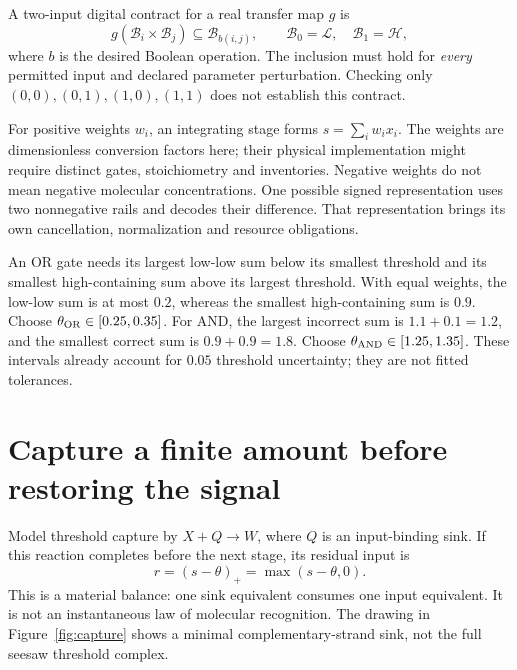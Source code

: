 A two-input digital contract for a real transfer map $g$ is
\begin{equation}
 g(\mathcal B_i\times\mathcal B_j)\subseteq
 \mathcal B_{b(i,j)},\qquad
 \mathcal B_0=\mathcal L,\quad \mathcal B_1=\mathcal H ,
\end{equation}
where $b$ is the desired Boolean operation. The inclusion must hold for
\emph{every} permitted input and declared parameter perturbation. Checking only
$(0,0),(0,1),(1,0),(1,1)$ does not establish this contract.

For positive weights $w_i$, an integrating stage forms
$s=\sum_iw_ix_i$. The weights are dimensionless conversion factors here;
their physical implementation might require distinct gates, stoichiometry
and inventories. Negative weights do not mean negative molecular concentrations.
One possible signed representation uses two nonnegative rails and decodes their
difference. That representation brings its own cancellation, normalization and
resource obligations.

An OR gate needs its largest low-low sum below its smallest threshold and its
smallest high-containing sum above its largest threshold. With equal weights,
the low-low sum is at most $0.2$, whereas the smallest high-containing sum is
$0.9$. Choose $\theta_{\rm OR}\in[0.25,0.35]$. For AND, the largest incorrect
sum is $1.1+0.1=1.2$, and the smallest correct sum is $0.9+0.9=1.8$.
Choose $\theta_{\rm AND}\in[1.25,1.35]$. These intervals already account for
$0.05$ threshold uncertainty; they are not fitted tolerances.

\section{Capture a finite amount before restoring the signal}

Model threshold capture by $X+Q\to W$, where $Q$ is an input-binding sink.
If this reaction completes before the next stage, its residual input is
\begin{equation}
 r=(s-\theta)_+=\max(s-\theta,0).
 \label{eq:residual}
\end{equation}
This is a material balance: one sink equivalent consumes one input equivalent.
It is not an instantaneous law of molecular recognition.
The drawing in Figure~\ref{fig:capture} shows a minimal complementary-strand
sink, not the full seesaw threshold complex.


